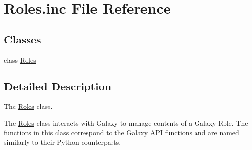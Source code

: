 \hypertarget{Roles_8inc}{}\section{Roles.\+inc File Reference}
\label{Roles_8inc}
\subsection*{Classes}
\begin{DoxyCompactItemize}
\item 
class \hyperlink{classRoles}{Roles}
\end{DoxyCompactItemize}


\subsection{Detailed Description}
The \hyperlink{classRoles}{Roles} class.

The \hyperlink{classRoles}{Roles} class interacts with Galaxy to manage contents of a Galaxy Role. The functions in this class correspond to the Galaxy A\+PI functions and are named similarly to their Python counterparts. 